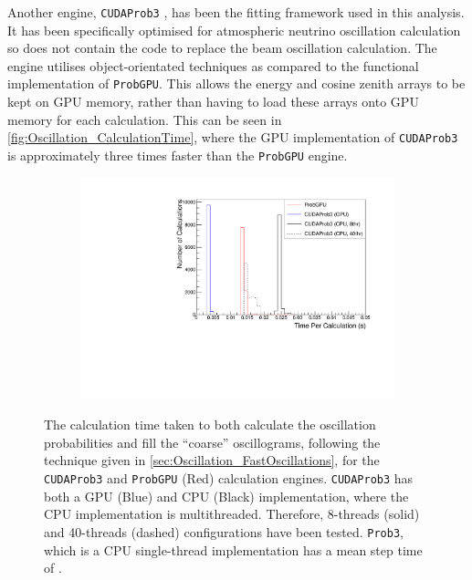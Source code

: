 Another engine, \texttt{CUDAProb3} \cite{cudaprob3}, has been   the fitting framework used in this analysis. It has been specifically optimised for atmospheric neutrino oscillation calculation so does not contain the code to replace the beam oscillation calculation. The engine utilises object-orientated techniques as compared to the functional implementation of \texttt{ProbGPU}. This allows the energy and cosine zenith arrays to be kept on GPU memory, rather than having to load these arrays onto GPU memory for each calculation.   This can be seen in \autoref{fig:Oscillation_CalculationTime}, where the GPU implementation of \texttt{CUDAProb3} is approximately three times faster than the \texttt{ProbGPU} engine. 

\begin{figure}[h]
  \begin{subfigure}[t]{0.8\textwidth}
    \includegraphics[width=\textwidth, trim={0mm 0mm 0mm 0mm}, clip,page=1]{Figures/Oscillation/CalculationTime.pdf}
  \end{subfigure}
  \caption{The calculation time taken to both calculate the oscillation probabilities and fill the ``coarse'' oscillograms, following the technique given in \autoref{sec:Oscillation_FastOscillations},  for the \texttt{CUDAProb3} and \texttt{ProbGPU} (Red) calculation engines. \texttt{CUDAProb3} has both a GPU (Blue) and CPU (Black) implementation, where the CPU implementation is multithreaded. Therefore, 8-threads (solid) and 40-threads (dashed) configurations have been tested. \texttt{Prob3}, which is a CPU single-thread implementation has a mean step time of .}
  \label{fig:Oscillation_CalculationTime}
\end{figure}

